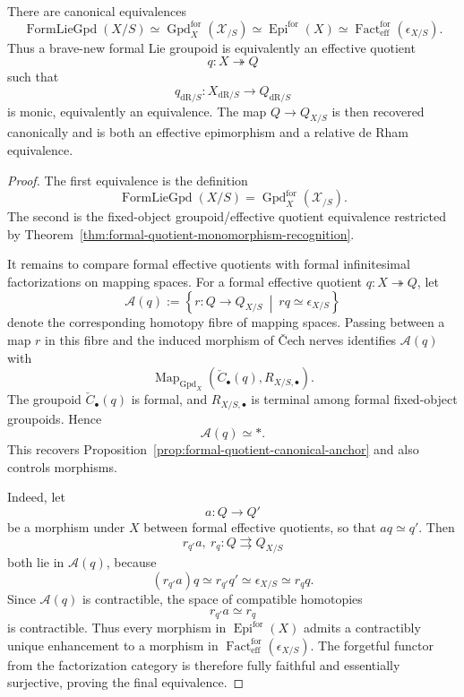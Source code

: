 \begin{theorem}
\label{thm:formal-gpd-quotient-classification}
There are canonical equivalences
\[
    \operatorname{FormLieGpd}(X/S)
    \simeq
    \operatorname{Gpd}^{\mathrm{for}}_X(\mathcal X_{/S})
    \simeq
    \operatorname{Epi}^{\mathrm{for}}(X)
    \simeq
    \operatorname{Fact}^{\mathrm{for}}_{\mathrm{eff}}
    (\epsilon_{X/S}).
\]
Thus a brave-new formal Lie groupoid is equivalently an effective quotient
\[
    q:X\twoheadrightarrow Q
\]
such that
\[
    q_{\mathrm{dR}/S}:
    X_{\mathrm{dR}/S}\to Q_{\mathrm{dR}/S}
\]
is monic, equivalently an equivalence.  The map
$Q\to Q_{X/S}$ is then recovered canonically and is both an effective
epimorphism and a relative de Rham equivalence.
\end{theorem}

\begin{proof}
The first equivalence is the definition
\[
    \operatorname{FormLieGpd}(X/S)
    =
    \operatorname{Gpd}^{\mathrm{for}}_X(\mathcal X_{/S}).
\]
The second is the fixed-object groupoid/effective quotient equivalence
restricted by
Theorem~\ref{thm:formal-quotient-monomorphism-recognition}.

It remains to compare formal effective quotients with formal infinitesimal
factorizations on mapping spaces.  For a formal effective quotient
$q:X\twoheadrightarrow Q$, let
\[
    \mathcal A(q)
    :=
    \left\{
        r:Q\to Q_{X/S}
        \ \middle|\ 
        rq\simeq\epsilon_{X/S}
    \right\}
\]
denote the corresponding homotopy fibre of mapping spaces.  Passing between a
map $r$ in this fibre and the induced morphism of \v{C}ech nerves identifies
$\mathcal A(q)$ with
\[
    \operatorname{Map}_{\operatorname{Gpd}_X}
    \left(
        \check C_\bullet(q),
        R_{X/S,\bullet}
    \right).
\]
The groupoid $\check C_\bullet(q)$ is formal, and
$R_{X/S,\bullet}$ is terminal among formal fixed-object groupoids.  Hence
\[
    \mathcal A(q)\simeq *.
\]
This recovers Proposition~\ref{prop:formal-quotient-canonical-anchor} and also
controls morphisms.

Indeed, let
\[
    a:Q\longrightarrow Q'
\]
be a morphism under $X$ between formal effective quotients, so that
$aq\simeq q'$.  Then
\[
    r_{q'}a,\ r_q:Q\rightrightarrows Q_{X/S}
\]
both lie in $\mathcal A(q)$, because
\[
    (r_{q'}a)q
    \simeq
    r_{q'}q'
    \simeq
    \epsilon_{X/S}
    \simeq
    r_qq.
\]
Since $\mathcal A(q)$ is contractible, the space of compatible homotopies
\[
    r_{q'}a\simeq r_q
\]
is contractible.  Thus every morphism in
$\operatorname{Epi}^{\mathrm{for}}(X)$ admits a contractibly unique enhancement
to a morphism in
$\operatorname{Fact}^{\mathrm{for}}_{\mathrm{eff}}(\epsilon_{X/S})$.
The forgetful functor from the factorization category is therefore fully
faithful and essentially surjective, proving the final equivalence.
\end{proof}

